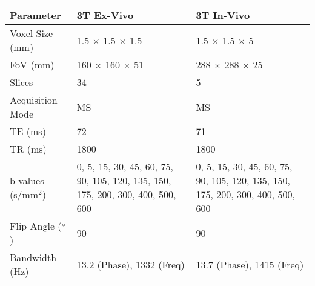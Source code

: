 \begin{table}[H]
	\centering
	\begin{tabularx}{1.0\textwidth}{X|X|X}
	\textbf{Parameter}                      & \textbf{3T Ex-Vivo}                                                              & \textbf{3T In-Vivo}                                                              \\ \hline
	Voxel Size (mm)                         & 1.5 $\times$ 1.5 $\times$ 1.5                                                                  & 1.5 $\times$ 1.5 $\times$ 5                                                                    \\ \hline
	FoV (mm)                                & 160 $\times$ 160 $\times$ 51                                                                   & 288 $\times$ 288 $\times$ 25                                                                   \\ \hline
	Slices                                  & 34                                                                               & 5                                                                                \\ \hline
	Acquisition Mode                        & MS                                                                               & MS                                                                               \\ \hline
	TE (ms)                                 & 72                                                                               & 71                                                                               \\ \hline
	TR (ms)                                 & 1800                                                                             & 1800                                                                             \\ \hline
	b-values (s/mm$^2$)                     & 0, 5, 15, 30, 45, 60, 75, 90, 105, 120, 135, 150, 175,   200, 300, 400, 500, 600 & 0, 5, 15, 30, 45, 60, 75, 90, 105, 120, 135, 150, 175,   200, 300, 400, 500, 600 \\ \hline
	Flip Angle ($\degree$)                  & 90                                                                               & 90                                                                               \\ \hline
	Bandwidth (Hz)                          & 13.2 (Phase), 1332 (Freq)                                                                            & 13.7 (Phase), 1415 (Freq)                                                                            \\ \hline

\end{tabularx}
\end{table}
